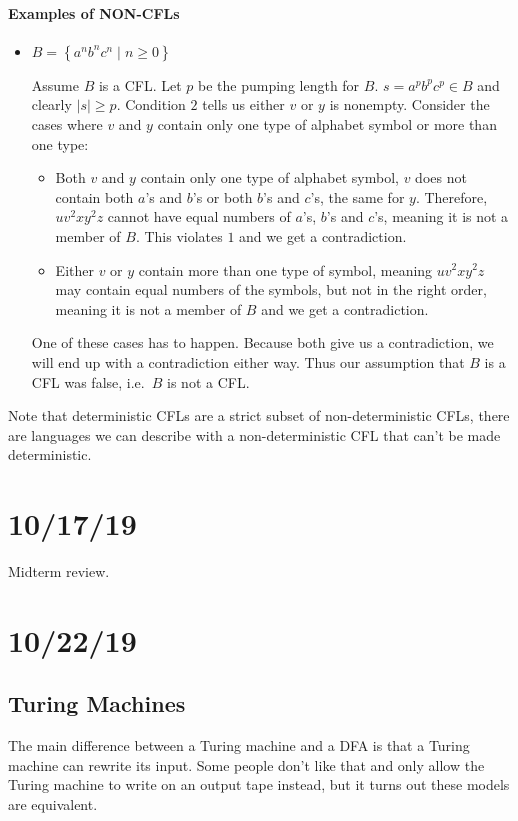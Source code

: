 \documentclass[12 pt]{article}
\begin{document}
\paragraph{Examples of NON-CFLs}
\begin{itemize}
\item $B = \left\{a^nb^nc^n \mid n \geq 0\right\}$

  Assume $B$ is a CFL. Let $p$ be the pumping length for $B$. $s =
  a^pb^pc^p \in B$ and clearly $|s| \geq p$. Condition $2$ tells us
  either $v$ or $y$ is nonempty. Consider the cases where $v$ and $y$
  contain only one type of alphabet symbol or more than one type:
  \begin{itemize}
  \item Both $v$ and $y$ contain only one type of alphabet symbol, $v$
    does not contain both $a$'s and $b$'s or both $b$'s and $c$'s, the
    same for $y$. Therefore, $uv^2xy^2z$ cannot have equal numbers of
    $a$'s, $b$'s and $c$'s, meaning it is not a member of $B$. This
    violates $1$ and we get a contradiction.
  \item Either $v$ or $y$ contain more than one type of symbol,
    meaning $uv^2xy^2z$ may contain equal numbers of the symbols, but
    not in the right order, meaning it is not a member of $B$ and we
    get a contradiction.
  \end{itemize}
  One of these cases has to happen. Because both give us a
  contradiction, we will end up with a contradiction either way. Thus
  our assumption that $B$ is a CFL was false, i.e.\ $B$ is not a CFL.
\end{itemize}

Note that deterministic CFLs are a strict subset of non-deterministic
CFLs, there are languages we can describe with a non-deterministic CFL
that can't be made deterministic.
\section{10/17/19}
Midterm review.
\section{10/22/19}
\subsection{Turing Machines}
The main difference between a Turing machine and a DFA is that a
Turing machine can rewrite its input. Some people don't like that and
only allow the Turing machine to write on an output tape instead, but
it turns out these models are equivalent.
\end{document}
